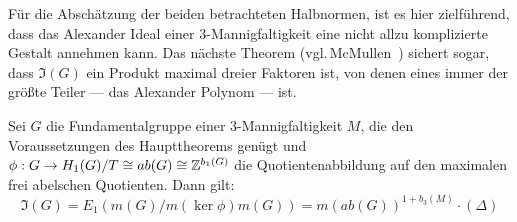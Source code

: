     Für die Abschätzung der beiden betrachteten Halbnormen, ist es hier zielführend, dass das Alexander Ideal einer 3-Mannigfaltigkeit eine nicht allzu komplizierte Gestalt annehmen kann. Das nächste Theorem (vgl.\,McMullen~\cite{MCMULLEN.2002}) sichert sogar, dass $\mathfrak I(G)$ ein Produkt maximal dreier Faktoren ist, von denen eines immer der größte Teiler --- das Alexander Polynom --- ist. 

\begin{thm}
\label{thm:keralexnorm}
	Sei $G$ die Fundamentalgruppe einer 3-Mannigfaltigkeit $M$, die den Voraussetzungen des Haupttheorems genügt und $\phi:G \to H_1(G)/T \cong ab(G) \cong \mathbb{Z}^{b_1(G)}$ die Quotientenabbildung auf den maximalen frei abelschen Quotienten. Dann gilt:
	\[
		\mathfrak I(G)=E_1(m(G)/m(\ker\phi)m(G)) = m(ab(G))^{1+b_3(M)}\cdot (\Delta) 
	\]
\end{thm}
